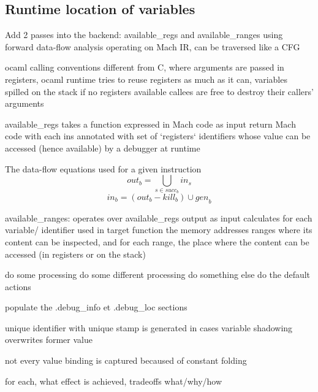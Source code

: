 \subsection{Runtime location of variables}


Add 2 passes into the backend: available\_regs and available\_ranges
using forward data-flow analysis operating on Mach IR, can be traversed like
a CFG


ocaml calling conventions different from C, where arguments are passed in
registers, ocaml runtime tries to reuse registers as much as it can, variables
spilled on the stack if no registers available
callees are free to destroy their callers' arguments

available\_regs
takes a function expressed in Mach code as input
return Mach code with each ins annotated with set of `registers` identifiers
whose value can be accessed (hence available) by a debugger at runtime

The data-flow equations used for a given instruction
\[
    \textit{out}_{b} = \bigcup_{s \in succ_{b}} \textit{in}_{s}
\]
\[
    \textit{in}_{b} = (\textit{out}_{b} - \textit{kill}_{b}) \cup \textit{gen}_{b}
\]

available\_ranges:
operates over available\_regs output as input
calculates for each variable/ identifier used in target function the memory
addresses ranges where its content can be inspected, and for each range, the
place where the content can be accessed (in registers or on the stack)

\begin{algorithmic}[1]
    \State do some processing
    \State do some different processing
    \State do something else
    \Else
    \State do the default actions
    \EndIf
\end{algorithmic}

populate the  .debug\_info et .debug\_loc sections

unique identifier with unique stamp is generated in cases variable shadowing overwrites former value

not every value binding is captured becaused of constant folding


for each, what effect is achieved, tradeoffs
what/why/how

